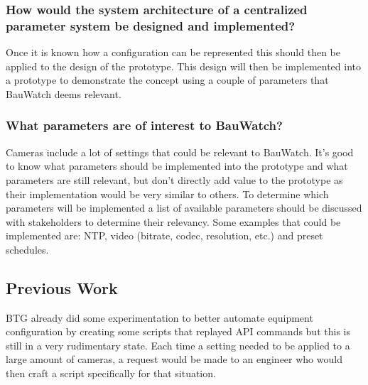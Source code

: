 \subsubsection{How would the system architecture of a centralized parameter system be designed and implemented?}
Once it is known how a configuration can be represented this should then be applied to the design of the prototype. This design will then be implemented into a
prototype to demonstrate the concept using a couple of parameters that BauWatch deems relevant.

\subsubsection{What parameters are of interest to BauWatch?}
Cameras include a lot of settings that could be relevant to BauWatch. It's good to know what parameters should be implemented into the prototype and what parameters are still relevant, but don't directly add value to the prototype as their implementation would be very similar to others. To determine which parameters will be implemented a list of available parameters should be discussed with stakeholders to determine their relevancy. Some examples that could be implemented are: NTP, video (bitrate, codec, resolution, etc.) and preset schedules.

\subsection{Previous Work}
BTG already did some experimentation to better automate equipment configuration by creating some scripts that replayed API commands but this is still
in a very rudimentary state. Each time a setting needed to be applied to a large amount of cameras, a request would be made to an engineer who would then craft a script
specifically for that situation.


